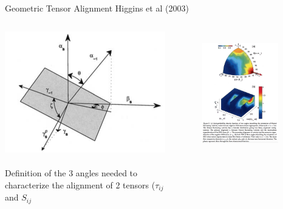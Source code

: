 \begin{frame}{Geometric Tensor Alignment}
Higgins et al (2003)    
	\begin{columns}
    \begin{column}{.45\textwidth}
    \begin{minipage}[c][.1\textheight][c]{\linewidth}
    \includegraphics[width=\textwidth]{apriori21}
    ~\\\tiny{Definition of the 3 angles needed to  characterize the alignment of 2 tensors ($\tau_{ij}$ and $S_{ij}$}
      \end{minipage}
    \end{column}
    \begin{column}{.55\textwidth}
    \vspace{-10pt}
      \begin{figure}
      ~\\\includegraphics[width=0.90\textwidth]{apriori22}

\end{figure}
\end{column}
\end{columns}
\end{frame}
